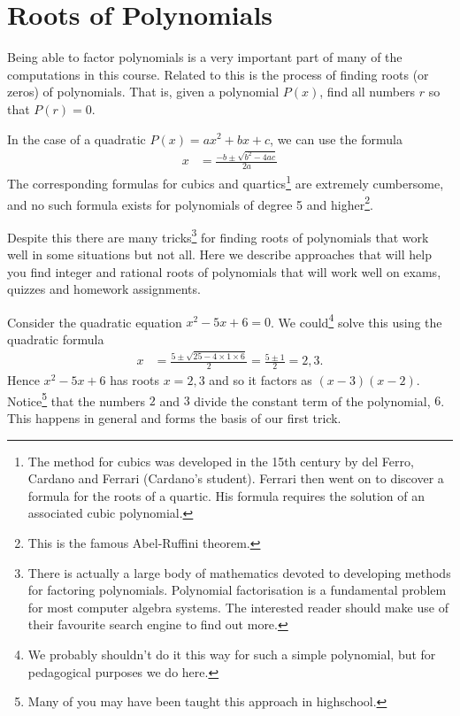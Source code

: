 %
%
\graphicspath{{figures/roots/}}

\section{Roots of Polynomials}\label{ap:roots}
Being able to factor polynomials is a very important part of many of the computations in
this course. Related to this is the process of finding roots (or zeros) of polynomials.
That is, given a polynomial $P(x)$, find all numbers $r$ so that $P(r)=0$.

In the case of a quadratic $P(x)=ax^2+bx+c$, we can use the formula
\begin{align*}
  x &= \frac{-b \pm \sqrt{b^2-4ac}}{2a}
\end{align*}
The corresponding formulas for cubics and quartics\footnote{The method for cubics was
developed in the 15th century by del Ferro, Cardano and Ferrari (Cardano's
student). Ferrari then went on to discover a formula for the roots of a quartic. His
formula requires the solution of an associated cubic polynomial.}
are extremely cumbersome, and no such formula exists for polynomials of degree 5
and higher\footnote{This is the famous Abel-Ruffini theorem.}.

Despite this there are many tricks\footnote{There is actually a large body of
mathematics devoted to developing methods for factoring polynomials. Polynomial
factorisation is a fundamental problem for most computer algebra systems. The interested
reader should make use of their favourite search engine to find out more.} for finding
roots of polynomials that work well in some situations but not all. Here we describe
approaches that will help you find integer and rational roots of polynomials that will
work well on exams, quizzes and homework assignments.

Consider the quadratic equation $x^2 - 5x + 6=0$. We could\footnote{We probably
shouldn't do it this way for such a simple polynomial, but for pedagogical
purposes we do here.} solve this using the quadratic formula
\begin{align*}
  x &= \frac{5 \pm \sqrt{25-4\times1\times6}}{2} = \frac{5 \pm 1}{2} = 2,3.
\end{align*}
Hence  $x^2 - 5x + 6$ has roots $x = 2,3$ and so it factors as $(x - 3)(x -
2)$. Notice\footnote{Many of you may have been taught this approach in
highschool.} that the numbers $2$ and $3$ divide the constant term of the
polynomial, $6$. This happens in general and forms the basis of our first trick.


